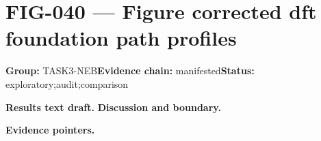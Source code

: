 \clearpage
\section{FIG-040 --- Figure corrected dft foundation path profiles}
\label{figpage:fig-040}
\textbf{Group:} TASK3-NEB\quad \textbf{Evidence chain:} manifested\quad \textbf{Status:} exploratory;audit;comparison

\textbf{Results text draft.} 
\textbf{Discussion and boundary.} 


\textbf{Evidence pointers.}



\vfill
